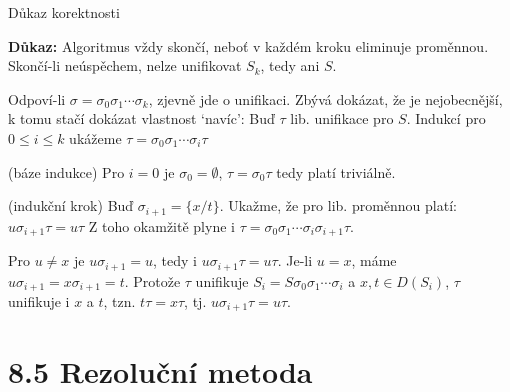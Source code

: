 \documentclass{beamer}
\begin{document}
\begin{frame}{Důkaz korektnosti}
    
    
    \textbf{Důkaz:} Algoritmus vždy skončí, neboť v každém kroku eliminuje proměnnou. Skončí-li neúspěchem, nelze unifikovat $S_k$, tedy ani $S$.
    
    Odpoví-li $\sigma=\sigma_0\sigma_1\cdots\sigma_k$, zjevně jde o unifikaci. Zbývá dokázat, že je nejobecnější, k tomu stačí dokázat vlastnost `navíc': Buď $\tau$ lib. unifikace pro $S$. Indukcí pro $0\leq i\leq k$ ukážeme \alert{$\tau=\sigma_0\sigma_1\cdots\sigma_i\tau$}
    
    \alert{(báze indukce)} Pro $i=0$ je $\sigma_0=\emptyset$, $\tau=\sigma_0\tau$ tedy platí triviálně.

    \alert{(indukční krok)} Buď $\sigma_{i+1}=\{x/t\}$. Ukažme, že pro lib. proměnnou platí: \alert{$u\sigma_{i+1}\tau=u\tau$} Z toho okamžitě plyne i $\tau=\sigma_0\sigma_1\cdots\sigma_i\sigma_{i+1}\tau$.
    
    Pro \alert{$u\neq x$} je $u\sigma_{i+1}=u$, tedy i $u\sigma_{i+1}\tau=u\tau$. Je-li \alert{$u=x$}, máme $u\sigma_{i+1}=x\sigma_{i+1}=t$. Protože $\tau$ unifikuje $S_i=S\sigma_0\sigma_1\cdots\sigma_i$ a $x,t\in D(S_i)$, $\tau$ unifikuje i $x$ a $t$, tzn. $t\tau=x\tau$, tj. $u\sigma_{i+1}\tau=u\tau$.\hfill\qedsymbol

\end{frame}


\section{8.5 Rezoluční metoda}
\end{document}
